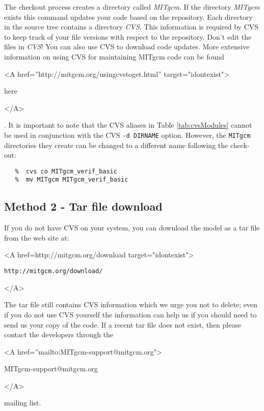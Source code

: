 The checkout process creates a directory called \textit{MITgcm}. If
the directory \textit{MITgcm} exists this command updates your code
based on the repository. Each directory in the source tree contains a
directory \textit{CVS}. This information is required by CVS to keep
track of your file versions with respect to the repository. Don't edit
the files in \textit{CVS}!  You can also use CVS to download code
updates.  More extensive information on using CVS for maintaining
MITgcm code can be found
\begin{rawhtml} <A href=''http://mitgcm.org/usingcvstoget.html'' target="idontexist"> \end{rawhtml}
here
\begin{rawhtml} </A> \end{rawhtml} 
.
It is important to note that the CVS aliases in Table
\ref{tab:cvsModules} cannot be used in conjunction with the CVS
\texttt{-d DIRNAME} option.  However, the \texttt{MITgcm} directories
they create can be changed to a different name following the check-out:
\begin{verbatim}
   %  cvs co MITgcm_verif_basic
   %  mv MITgcm MITgcm_verif_basic
\end{verbatim}


\subsection{Method 2 - Tar file download}
\label{sect:conventionalDownload}

If you do not have CVS on your system, you can download the model as a
tar file from the web site at:
\begin{rawhtml} <A href=http://mitgcm.org/download target="idontexist"> \end{rawhtml}
\begin{verbatim}
http://mitgcm.org/download/
\end{verbatim}
\begin{rawhtml} </A> \end{rawhtml}
The tar file still contains CVS information which we urge you not to
delete; even if you do not use CVS yourself the information can help
us if you should need to send us your copy of the code.  If a recent
tar file does not exist, then please contact the developers through
the 
\begin{rawhtml} <A href=''mailto:MITgcm-support@mitgcm.org"> \end{rawhtml}
MITgcm-support@mitgcm.org
\begin{rawhtml} </A> \end{rawhtml}
mailing list.

